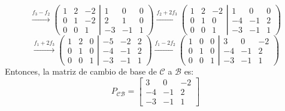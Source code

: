 \documentclass[a4paper,12pt]{article}
\begin{document}
$$
\xrightarrow[]{f_3-f_2}
\left ( \left.\begin{matrix}
    1 & 2 & -2 \\ 
    0 & 1 & -2 \\ 
    0 & 0 & 1
    \end{matrix}\right| \begin{matrix}
    1 & 0 & 0 \\ 
    2 & 1 & 0 \\ 
    -3 & -1 & 1
    \end{matrix}\right )
\xrightarrow[]{f_2+2f_3}
\left ( \left.\begin{matrix}
    1 & 2 & -2 \\ 
    0 & 1 & 0 \\ 
    0 & 0 & 1
    \end{matrix}\right| \begin{matrix}
    1 & 0 & 0 \\ 
    -4 & -1 & 2 \\ 
    -3 & -1 & 1
    \end{matrix}\right )
$$
$$
\xrightarrow[]{f_1+2f_3}
\left ( \left.\begin{matrix}
    1 & 2 & 0 \\ 
    0 & 1 & 0 \\ 
    0 & 0 & 1
    \end{matrix}\right| \begin{matrix}
    -5 & -2 & 2 \\ 
    -4 & -1 & 2 \\ 
    -3 & -1 & 1
    \end{matrix}\right )
\xrightarrow[]{f_1-2f_2}
\left ( \left.\begin{matrix}
    1 & 0 & 0 \\ 
    0 & 1 & 0 \\ 
    0 & 0 & 1
    \end{matrix}\right| \begin{matrix}
    3 & 0 & -2 \\ 
    -4 & -1 & 2 \\ 
    -3 & -1 & 1
    \end{matrix}\right )
$$
Entonces, la matriz de cambio de base de $\mathcal{C}$ a $\mathcal{B}$ es:
$$
P_{\mathcal{C} \mathcal{B}} = \begin{bmatrix}
    3 & 0 & -2 \\ 
    -4 & -1 & 2 \\ 
    -3 & -1 & 1
\end{bmatrix}
$$
\end{document}
